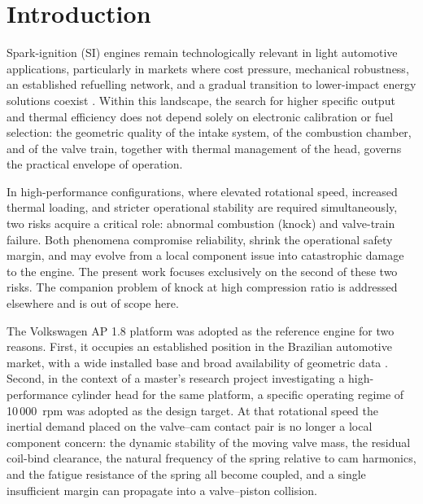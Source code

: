 
\section{Introduction}\label{sec:intro}

Spark-ignition (SI) engines remain technologically relevant in light
automotive applications, particularly in markets where cost pressure,
mechanical robustness, an established refuelling network, and a gradual
transition to lower-impact energy solutions coexist
\citep{heywood1988,stone2012}. Within this landscape, the search for
higher specific output and thermal efficiency does not depend solely on
electronic calibration or fuel selection: the geometric quality of the
intake system, of the combustion chamber, and of the valve train, together
with thermal management of the head, governs the practical envelope of
operation.

In high-performance configurations, where elevated rotational speed,
increased thermal loading, and stricter operational stability are required
simultaneously, two risks acquire a critical role: abnormal combustion
(knock) and valve-train failure. Both phenomena compromise reliability,
shrink the operational safety margin, and may evolve from a local
component issue into catastrophic damage to the engine. The present work
focuses exclusively on the second of these two risks. The companion
problem of knock at high compression ratio is addressed elsewhere and is
out of scope here.

The Volkswagen AP 1.8 platform was adopted as the reference engine for
two reasons. First, it occupies an established position in the Brazilian
automotive market, with a wide installed base and broad availability of
geometric data \citep[][\S~1.6]{porto2026dissertation}. Second, in the
context of a master's research project investigating a high-performance
cylinder head for the same platform, a specific operating regime of
10\,000~rpm was adopted as the design target. At that rotational speed
the inertial demand placed on the valve--cam contact pair is no longer a
local component concern: the dynamic stability of the moving valve mass,
the residual coil-bind clearance, the natural frequency of the spring
relative to cam harmonics, and the fatigue resistance of the spring all
become coupled, and a single insufficient margin can propagate into a
valve--piston collision.

